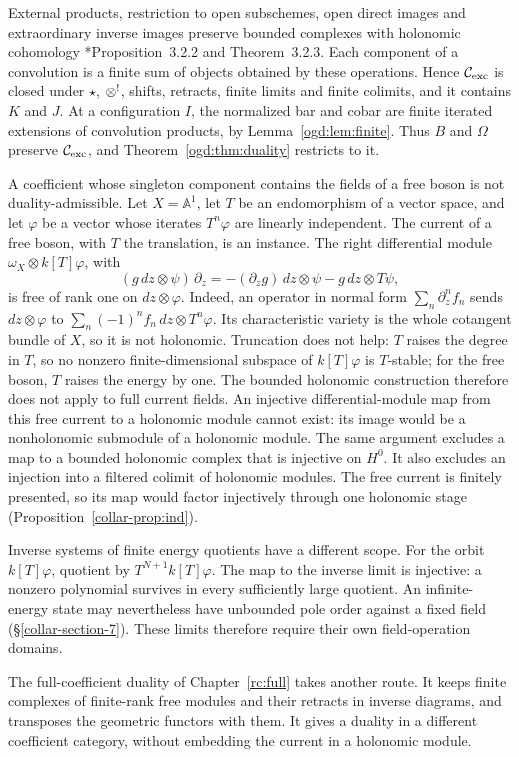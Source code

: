 External products, restriction to open subschemes, open direct images and extraordinary inverse images preserve bounded complexes with holonomic cohomology \cite{kd-HTT}*{Proposition~3.2.2 and Theorem~3.2.3}.
Each component of a convolution is a finite sum of objects obtained by these operations.
Hence \(\mathcal C_{\mathrm{exc}}\) is closed under \(\star\), \(\mathbin{\otimes^!}\), shifts, retracts, finite limits and finite colimits, and it contains \(K\) and \(J\).
At a configuration \(I\), the normalized bar and cobar are finite iterated extensions of convolution products, by Lemma~\ref{ogd:lem:finite}.
Thus \(B\) and \(\Omega\) preserve \(\mathcal C_{\mathrm{exc}}\), and Theorem~\ref{ogd:thm:duality} restricts to it.

\begin{remark}\label{ogd:rem:current}
A coefficient whose singleton component contains the fields of a free boson is not duality-admissible.
Let \(X=\mathbb A^1\), let \(T\) be an endomorphism of a vector space, and let \(\varphi\) be a vector whose iterates \(T^n\varphi\) are linearly independent.
The current of a free boson, with \(T\) the translation, is an instance.
The right differential module \(\omega_X\otimes k[T]\varphi\), with
\[
 (g\,dz\otimes\psi)\,\partial_z=-(\partial_zg)\,dz\otimes\psi-g\,dz\otimes T\psi,
\]
is free of rank one on \(dz\otimes\varphi\).
Indeed, an operator in normal form \(\sum_n\partial_z^nf_n\) sends \(dz\otimes\varphi\) to \(\sum_n(-1)^nf_n\,dz\otimes T^n\varphi\).
Its characteristic variety is the whole cotangent bundle of \(X\), so it is not holonomic.
Truncation does not help: \(T\) raises the degree in \(T\), so no nonzero finite-dimensional subspace of \(k[T]\varphi\) is \(T\)-stable; for the free boson, \(T\) raises the energy by one.
The bounded holonomic construction therefore does not apply to full current fields.
An injective differential-module map from this free current to a
holonomic module cannot exist: its image would be a nonholonomic
submodule of a holonomic module.
The same argument excludes a map to a bounded holonomic complex
that is injective on $H^0$.
It also excludes an injection into a filtered colimit of holonomic
modules. The free current is finitely presented, so its map would
factor injectively through one holonomic stage
(Proposition~\ref{collar-prop:ind}).

Inverse systems of finite energy quotients have a different scope.
For the orbit $k[T]\varphi$, quotient by $T^{N+1}k[T]\varphi$.
The map to the inverse limit is injective: a nonzero polynomial
survives in every sufficiently large quotient.
An infinite-energy state may nevertheless have unbounded pole order
against a fixed field (\S\ref{collar-section-7}).
These limits therefore require their own field-operation domains.

The full-coefficient duality of Chapter~\ref{rc:full} takes another
route. It keeps finite complexes of finite-rank free modules and
their retracts in inverse diagrams, and transposes the geometric
functors with them.
It gives a duality in a different coefficient category, without
embedding the current in a holonomic module.
\end{remark}

